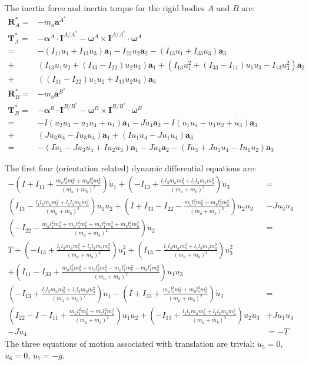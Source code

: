 \documentclass[letterpaper,11pt]{article}
\newcommand{\bs}[1]{ \boldsymbol{ #1 } }
\begin{document}
The inertia force and inertia torque for the rigid bodies $A$ and $B$ are:
\begin{align*}
  \bs{R}^*_A  =& -m_a \bs{a}^{A^*} \\
  \bs{T}^*_A  =& -\bs{\alpha}^A \cdot \bs{I}^{A/A^*} - \bs{\omega}^A \times
  \bs{I}^{A/A^*} \cdot \bs{\omega}^A \\
  = &-(I_{11}\dot{u}_1 + I_{13}\dot{u}_3)\bs{a}_1 - I_{22}\dot{u}_2\bs{a}_2 -
  (I_{13}\dot{u}_1 + I_{33}\dot{u}_3)\bs{a}_3 \\
   + & (I_{13}u_1u_2 + (I_{33} - I_{22})u_2u_3)\bs{a}_1 +
  (I_{13}u_1^2 + (I_{33}- I_{11})u_1u_3 - I_{13}u_3^2)\bs{a}_2 \\
  + & ((I_{11} - I_{22})u_1u_2 + I_{13}u_2u_3)\bs{a}_3 \\
  \bs{R}^*_B = & -m_b \bs{a}^{B^*} \\
  \bs{T}^*_B = & -\bs{\alpha}^B \cdot \bs{I}^{B/B^*} - \bs{\omega}^B \times
  \bs{I}^{B/B^*} \cdot \bs{\omega}^B \\
  = & -I(u_2u_3 - u_3u_4 + \dot{u}_1)\bs{a}_1 - J\dot{u}_4\bs{a}_2 - I(u_1u_4 - u_1u_2 +
  \dot{u}_3)\bs{a}_3 \\
  + & (Ju_3u_4 - Iu_3u_4)\bs{a}_1 + (Iu_1u_4 - Ju_1u_4)\bs{a}_3 \\
  = &-(I\dot{u}_1 - Ju_3u_4 + Iu_2u_3)\bs{a}_1 - J\dot{u}_4\bs{a}_2 -
  (I\dot{u}_3 + Ju_1u_4 - Iu_1u_2)\bs{a}_3
\end{align*}

The first four (orientation related) dynamic differential equations are:
\begin{align*}
  -\left(I + I_{11} + \frac{m_al_3^2m_b^2 + m_bl_3^2m_a^2}{(m_a +
  m_b)^2}\right)\dot{u}_{1}
  + \left(-I_{13} + \frac{l_1l_3m_am_b^2 + l_1l_3m_bm_a^2}{(m_a + m_b)^2}\right)\dot{u}_{3}
  & = \\
  \left(I_{13} - \frac{l_1l_3m_am_b^2 + l_1l_3m_bm_a^2}{(m_a + m_b)^2}\right)u_1u_2 +
  \left(I + I_{33} - I_{22} - \frac{m_al_3^2m_b^2 + m_bl_3^2m_a^2}{(m_a +
  m_b)^2}\right)u_2u_3 &- Ju_3u_4 &
  \\
  \left(-I_{22} - \frac{m_al_1^2m_b^2 + m_al_3^2m_b^2 + m_bl_1^2m_a^2 +
  m_bl_3^2m_a^2}{(m_a + m_b)^2}\right) \dot{u}_2
  & = \\
  T + \left(-I_{13} + \frac{l_1l_3m_am_b^2 + l_1l_3m_bm_a^2}{(m_a +
  m_b)^2}\right)u_1^2
  + \left(I_{13} - \frac{l_1l_3m_am_b^2 + l_1l_3m_bm_a^2}{(m_a +
  m_b)^2}\right)u_3^2 &
  \\
  +\left(I_{11} - I_{33} + \frac{m_al_3^2m_b^2 + m_bl_3^2m_a^2 -
  m_al_1^2m_b^2 - m_bl_1^2m_a^2}{(m_a + m_b)^2}\right)u_1u_3 &
  \\
  \left(-I_{13} + \frac{l_1l_3m_am_b^2 + l_1l_3m_bm_a^2}{(m_a + m_b)^2}\right)
  \dot{u}_1 -
  \left(I + I_{33} + \frac{m_al_1^2m_b^2 + m_bl_1^2m_a^2}{(m_a + m_b)^2}
  \right) \dot{u}_3
  & = \\
  \left(I_{22} - I - I_{11} + \frac{m_al_1^2m_b^2 +
  m_bl_1^2m_a^2}{(m_a + m_b)^2}\right)u_1u_2 + \left(-I_{13} + \frac{l_1l_3m_am_b^2 + l_1l_3m_bm_a^2}{(m_a +
  m_b)^2}\right)u_2u_3 &+ Ju_1u_4\\
  -J\dot{u}_4 &=  -T
\end{align*}
The three equations of motion associated with translation are trivial:
$\dot{u}_5 = 0$, $\dot{u}_6 = 0$, $\dot{u}_7 = -g$.
\end{document}
